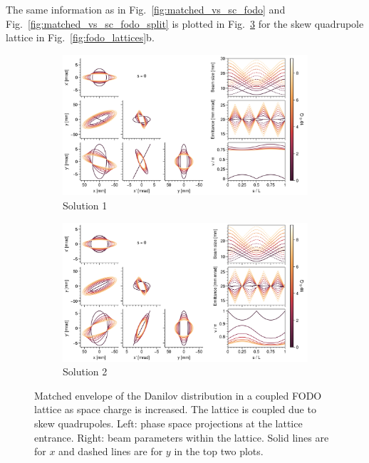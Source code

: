 The same information as in Fig.~\ref{fig:matched_vs_sc_fodo} and Fig.~\ref{fig:matched_vs_sc_fodo_split} is plotted in Fig.~\ref{fig:matched_vs_sc_fodo_skew} for the skew quadrupole lattice in Fig.~\ref{fig:fodo_lattices}b.
%
\begin{figure}[!p]
    \begin{subfigure}{1.0\textwidth}
        \includegraphics[width=\textwidth]{Images/chapter2/matched_vs_sc_fodo_skew_mode1.png}
        \caption{Solution 1}
        \label{fig:matched_vs_sc_fodo_skew_a}
    \end{subfigure}
    \vfill
    \vfill
    \begin{subfigure}{1.0\textwidth}
        \centering
        \includegraphics[width=\textwidth]{Images/chapter2/matched_vs_sc_fodo_skew_mode2.png}
        \caption{Solution 2}
        \label{fig:matched_vs_sc_fodo_skew_b}
    \end{subfigure}
    \caption{Matched envelope of the Danilov distribution in a coupled FODO lattice as space  charge is increased. The lattice is coupled due to skew quadrupoles. Left: phase space projections at the lattice entrance. Right: beam parameters within the lattice. Solid lines are for $x$ and dashed lines are for $y$ in the top two plots.}
    \label{fig:matched_vs_sc_fodo_skew}
\end{figure}
